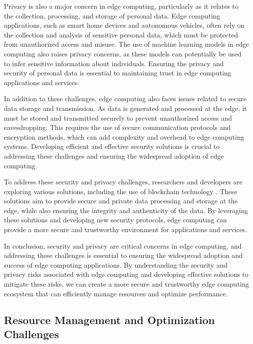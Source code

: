 \documentclass[11pt]{article}
\begin{document}
Privacy is also a major concern in edge computing, particularly as it relates to the collection, processing, and storage of personal data. Edge computing applications, such as smart home devices and autonomous vehicles, often rely on the collection and analysis of sensitive personal data, which must be protected from unauthorized access and misuse. The use of machine learning models in edge computing also raises privacy concerns, as these models can potentially be used to infer sensitive information about individuals. Ensuring the privacy and security of personal data is essential to maintaining trust in edge computing applications and services.

In addition to these challenges, edge computing also faces issues related to secure data storage and transmission. As data is generated and processed at the edge, it must be stored and transmitted securely to prevent unauthorized access and eavesdropping. This requires the use of secure communication protocols and encryption methods, which can add complexity and overhead to edge computing systems. Developing efficient and effective security solutions is crucial to addressing these challenges and ensuring the widespread adoption of edge computing.

To address these security and privacy challenges, researchers and developers are exploring various solutions, including the use of blockchain technology \cite{ref49}. These solutions aim to provide secure and private data processing and storage at the edge, while also ensuring the integrity and authenticity of the data. By leveraging these solutions and developing new security protocols, edge computing can provide a more secure and trustworthy environment for applications and services.

In conclusion, security and privacy are critical concerns in edge computing, and addressing these challenges is essential to ensuring the widespread adoption and success of edge computing applications. By understanding the security and privacy risks associated with edge computing and developing effective solutions to mitigate these risks, we can create a more secure and trustworthy edge computing ecosystem that can efficiently manage resources and optimize performance.

\subsection{Resource Management and Optimization Challenges}
\end{document}
